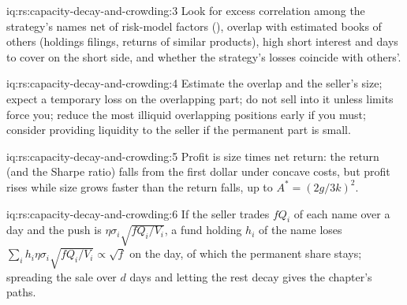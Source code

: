 \begin{solution}{iq:rs:capacity-decay-and-crowding:3}
Look for excess correlation among the strategy's names net of risk-model factors (), overlap with estimated books of others (holdings filings, returns
of similar products), high short interest and days to cover on the short side, and whether the strategy's losses coincide with others'.
\end{solution}

\begin{solution}{iq:rs:capacity-decay-and-crowding:4}
Estimate the overlap and the seller's size; expect a temporary loss on the overlapping part; do not sell into it unless limits force you; reduce the most
illiquid overlapping positions early if you must; consider providing liquidity to the seller if the permanent part is small.
\end{solution}

\begin{solution}{iq:rs:capacity-decay-and-crowding:5}
Profit is size times net return: the return (and the Sharpe ratio) falls from the first dollar under concave costs, but profit rises while size grows faster than
the return falls, up to $A^* = (2g/3k)^2$.
\end{solution}

\begin{solution}{iq:rs:capacity-decay-and-crowding:6}
If the seller trades $fQ_i$ of each name over a day and the push is $\eta\sigma_i\sqrt{fQ_i/V_i}$, a fund holding $h_i$ of the name loses
$\sum_i h_i\eta\sigma_i\sqrt{fQ_i/V_i} \propto \sqrt f$ on the day, of which the permanent share stays; spreading the sale over $d$ days and letting the rest decay
gives the chapter's paths.
\end{solution}
